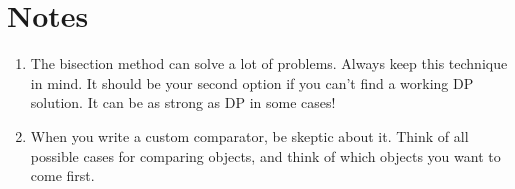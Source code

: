 \documentclass[12pt]{book}
\begin{document}
\section{Notes}
\begin{enumerate}[label = \roman*.]
\item The bisection method can solve a lot of problems. Always keep this technique in mind. It should be your second option if you can't find a working DP solution. It can be as strong as DP in some cases!
\item When you write a custom comparator, be skeptic about it. Think of all possible cases for comparing objects, and think of which objects you want to come first.
\end{enumerate}
\end{document}
